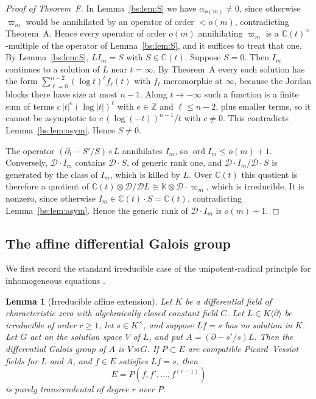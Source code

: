 \documentclass[11pt,a4paper]{article}
\newtheorem{lemma}[theorem]{Lemma}
\theoremstyle{definition}
\theoremstyle{remark}
\numberwithin{equation}{section}
\newcommand{\C}{\mathbb{C}}
\newcommand{\Z}{\mathbb{Z}}
\DeclareMathOperator{\ord}{ord}
\newcommand{\Kt}{\mathbb{K}}
\newcommand{\cD}{\mathcal{D}}
\begin{document}
\begin{proof}[Proof of Theorem~F]
In Lemma~\ref{bs:lem:S} we have $\alpha_{o(m)}\ne0$, since otherwise $\varpi_m$ would be annihilated by an operator of order $<o(m)$, contradicting Theorem~A. Hence every operator of order $o(m)$ annihilating $\varpi_m$ is a $\C(t)^\times$-multiple of the operator of Lemma~\ref{bs:lem:S}, and it suffices to treat that one. By Lemma~\ref{bs:lem:S}, $LI_m=S$ with $S\in\C(t)$. Suppose $S=0$. Then $I_m$ continues to a solution of $L$ near $t=\infty$. By Theorem~A every such solution has the form $\sum_{\ell=0}^{n-2}(\log t)^\ell f_\ell(t)$ with $f_\ell$ meromorphic at $\infty$, because the Jordan blocks there have size at most $n-1$. Along $t\to-\infty$ such a function is a finite sum of terms $c\,|t|^e(\log|t|)^\ell$ with $e\in\Z$ and $\ell\le n-2$, plus smaller terms, so it cannot be asymptotic to $c\,(\log(-t))^{n-1}/t$ with $c\ne0$. This contradicts Lemma~\ref{bs:lem:asym}. Hence $S\ne0$.

The operator $(\partial_t-S'/S)\circ L$ annihilates $I_m$, so $\ord I_m\le o(m)+1$. Conversely, $\cD\cdot I_m$ contains $\cD\cdot S$, of generic rank one, and $\cD\cdot I_m/\cD\cdot S$ is generated by the class of $I_m$, which is killed by $L$. Over $\C(t)$ this quotient is therefore a quotient of $\C(t)\otimes\cD/\cD L\cong\Kt\otimes\cD\cdot\varpi_m$, which is irreducible. It is nonzero, since otherwise $I_m\in\C(t)\cdot S=\C(t)$, contradicting Lemma~\ref{bs:lem:asym}. Hence the generic rank of $\cD\cdot I_m$ is $o(m)+1$.
\end{proof}

\subsection{The affine differential Galois group}
We first record the standard irreducible case of the unipotent-radical principle for inhomogeneous equations \cite[\S1.1, (N.3), and Thm.~1.1]{Ber01}.

\begin{lemma}[Irreducible affine extension]\label{bs:lem:affine}
Let $K$ be a differential field of characteristic zero with algebraically closed constant field $C$. Let $L\in K\langle\partial\rangle$ be irreducible of order $r\ge1$, let $s\in K^\times$, and suppose $Lf=s$ has no solution in $K$. Let $G$ act on the solution space $V$ of $L$, and put $A=(\partial-s'/s)L$. Then the differential Galois group of $A$ is $V\rtimes G$. If $P\subset E$ are compatible Picard--Vessiot fields for $L$ and $A$, and $f\in E$ satisfies $Lf=s$, then
\[
E=P(f,f',\ldots,f^{(r-1)})
\]
is purely transcendental of degree $r$ over $P$.
\end{lemma}
\end{document}
